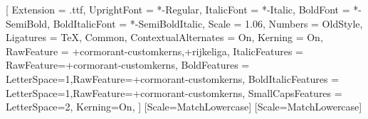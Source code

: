 \setmainfont{CormorantGaramond}[
  Extension = .ttf,
  UprightFont = *-Regular,
  ItalicFont = *-Italic,
  BoldFont = *-SemiBold,
  BoldItalicFont = *-SemiBoldItalic,
  Scale = 1.06,
  Numbers = OldStyle,
  Ligatures = {TeX, Common},
  ContextualAlternates = On,
  Kerning = On,
  RawFeature = {+cormorant-customkerns,+rijkeliga},
  ItalicFeatures = {RawFeature={+cormorant-customkerns}},
  BoldFeatures = {LetterSpace=1,RawFeature={+cormorant-customkerns}},
  BoldItalicFeatures = {LetterSpace=1,RawFeature={+cormorant-customkerns}},
  SmallCapsFeatures = {LetterSpace=2, Kerning=On},
]
\setsansfont{TeX Gyre Heros}[Scale=MatchLowercase]
\setmonofont{Inconsolatazi4}[Scale=MatchLowercase]
\linespread{1.14}

\newcommand{\VersionFontName}{Cormorant Garamond}






